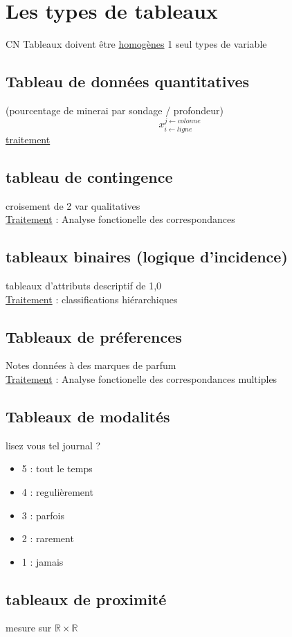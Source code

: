 \documentclass[a4paper]{report}
\begin{document}
\section{Les types de tableaux}
CN   Tableaux doivent être \underline{homogènes} 1 seul types de variable
\subsection{Tableau de données quantitatives}
(pourcentage de minerai par sondage / profondeur)
$$x^{j\leftarrow colonne}_{i\leftarrow ligne}$$
\underline{traitement}
\subsection{tableau de contingence}
croisement de 2 var qualitatives \\
\underline{Traitement} : Analyse fonctionelle des correspondances
\subsection{tableaux binaires (logique d'incidence)}
tableaux d'attributs descriptif de 1,0 \\
\underline{Traitement} : classifications hiérarchiques\\
\subsection{Tableaux de préferences}
Notes données à des marques de parfum\\
\underline{Traitement} : Analyse fonctionelle des correspondances multiples
\subsection{Tableaux de modalités}

lisez vous tel journal ? \\
\begin{itemize}
  \item 5 : tout le temps
  \item 4 : regulièrement
  \item 3 : parfois
  \item 2 : rarement
  \item 1 : jamais
\end{itemize}

\subsection{tableaux de proximité}
mesure sur $\mathbb{R}\times\mathbb{R}$
\end{document}
